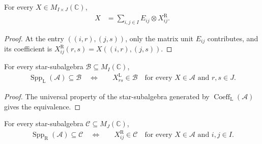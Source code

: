 \begin{lemma}
    \label{thm:qca_right_coefficient_reconstruction}
    \leanok
    For every $X\in M_{I\times J}(\mathbb C)$,
    \begin{align}
        X & =\sum_{i,j\in I}E_{ij}\otimes X^{\mathrm R}_{ij}.
    \end{align}
\end{lemma}

\begin{proof}\leanok
    At the entry $((i,r),(j,s))$, only the matrix unit $E_{ij}$ contributes,
    and its coefficient is $X^{\mathrm R}_{ij}(r,s)=X((i,r),(j,s))$.
\end{proof}

\begin{lemma}
    \label{thm:qca_left_support_minimality}
    \leanok
    For every star-subalgebra $\mathcal B\subseteq M_I(\mathbb C)$,
    \begin{align}
        \operatorname{Spp}_{\mathrm L}(\mathcal A)\subseteq\mathcal B
        \quad\Longleftrightarrow\quad
         & X^{\mathrm L}_{rs}\in\mathcal B
        \quad\text{for every }X\in\mathcal A\text{ and }r,s\in J.
    \end{align}
\end{lemma}

\begin{proof}\leanok
    The universal property of the star-subalgebra generated by
    $\operatorname{Coeff}_{\mathrm L}(\mathcal A)$ gives the equivalence.
\end{proof}

\begin{lemma}
    \label{thm:qca_right_support_minimality}
    \leanok
    For every star-subalgebra $\mathcal C\subseteq M_J(\mathbb C)$,
    \begin{align}
        \operatorname{Spp}_{\mathrm R}(\mathcal A)\subseteq\mathcal C
        \quad\Longleftrightarrow\quad
         & X^{\mathrm R}_{ij}\in\mathcal C
        \quad\text{for every }X\in\mathcal A\text{ and }i,j\in I.
    \end{align}
\end{lemma}


